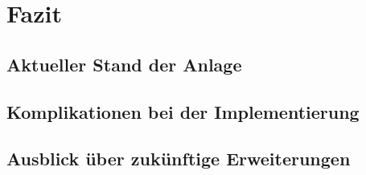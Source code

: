 \chapter{Fazit}

\section{Aktueller Stand der Anlage}

\section{Komplikationen bei der Implementierung}

\section{Ausblick über zukünftige Erweiterungen}
